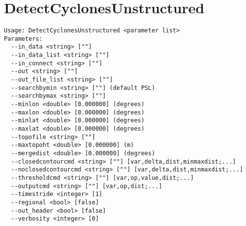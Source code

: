 \documentclass{article}
\begin{document}
\section{DetectCyclonesUnstructured}

\begin{verbatim}
Usage: DetectCyclonesUnstructured <parameter list>
Parameters:
  --in_data <string> [""] 
  --in_data_list <string> [""]
  --in_connect <string> [""] 
  --out <string> [""] 
  --out_file_list <string> [""]
  --searchbymin <string> [""] (default PSL)
  --searchbymax <string> [""] 
  --minlon <double> [0.000000] (degrees)
  --maxlon <double> [0.000000] (degrees)
  --minlat <double> [0.000000] (degrees)
  --maxlat <double> [0.000000] (degrees)
  --topofile <string> [""] 
  --maxtopoht <double> [0.000000] (m)
  --mergedist <double> [0.000000] (degrees)
  --closedcontourcmd <string> [""] [var,delta,dist,minmaxdist;...]
  --noclosedcontourcmd <string> [""] [var,delta,dist,minmaxdist;...]
  --thresholdcmd <string> [""] [var,op,value,dist;...]
  --outputcmd <string> [""] [var,op,dist;...]
  --timestride <integer> [1] 
  --regional <bool> [false] 
  --out_header <bool> [false] 
  --verbosity <integer> [0] 
\end{verbatim}
\end{document}
